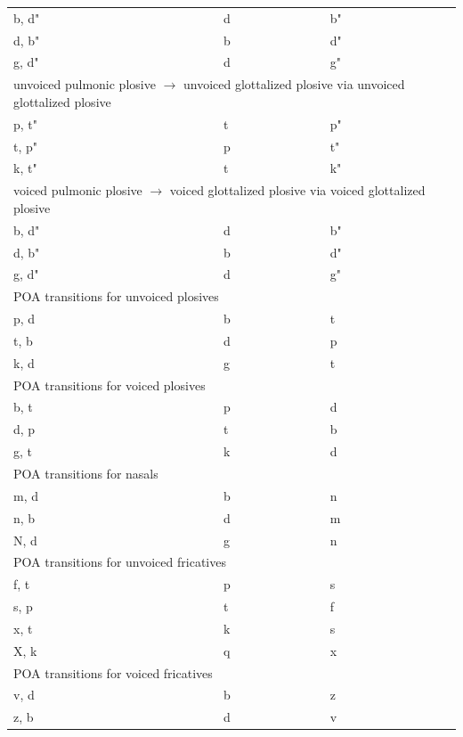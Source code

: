 \documentclass[11pt]{article}
\begin{document}
\begin{table}[h]
\begin{tabular}{ l | l | l }
b, d" & d & b" \\
d, b" & b & d" \\
g, d" & d & g" \\

\hline \multicolumn{3}{l}{unvoiced pulmonic plosive  $\rightarrow$ unvoiced glottalized plosive via unvoiced glottalized plosive  }\\  \hline

p, t" & t & p" \\
t, p" & p & t" \\
k, t" & t & k" \\

\hline \multicolumn{3}{l}{voiced pulmonic plosive  $\rightarrow$ voiced glottalized plosive via voiced glottalized plosive}\\  \hline

b, d" & d & b" \\
d, b" & b & d" \\
g, d" & d & g" \\

\hline \multicolumn{3}{l}{POA transitions for unvoiced plosives}\\  \hline
p, d & b & t \\
t, b & d & p \\
k, d & g & t \\

\hline \multicolumn{3}{l}{POA transitions for voiced plosives}\\  \hline

b, t & p & d \\
d, p & t & b \\
g, t & k & d \\

\hline \multicolumn{3}{l}{POA transitions for  nasals}\\  \hline

m, d & b & n \\
n, b & d & m \\
N, d & g & n \\

\hline \multicolumn{3}{l}{POA transitions for unvoiced fricatives}\\  \hline

f, t & p & s \\
s, p & t & f \\
x, t & k & s \\
X, k & q & x \\

\hline \multicolumn{3}{l}{POA transitions for voiced fricatives}\\  \hline

v, d & b & z \\
z, b & d & v \\
\end{tabular}
\end{table}
\end{document}
